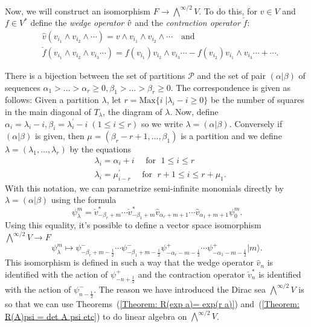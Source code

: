 Now, we will construct an isomorphism $F\rightarrow \bigwedge^{\infty/2}V$. To do this, for $v\in V$ and $f\in V^*$ define the \textit{wedge operator} $\Hat{v}$ and the \textit{contraction operator} $\check{f}$:
\begin{equation}
    \begin{split}
        &\hat{v}(v_{i_1}\wedge v_{i_2}\wedge\cdots) = v\wedge v_{i_1}\wedge v_{i_2}\wedge\cdots\quad\text{and}\\
        &\check{f}(v_{i_1}\wedge v_{i_2}\wedge v_{i_3}\cdots)= f(v_{i_1})v_{i_2}\wedge v_{i_3}\cdots - f(v_{i_2})v_{i_1}\wedge v_{i_3}\cdots+\cdots.
    \end{split}
\end{equation}


There is a bijection between the set of partitions $\mathcal{P}$ and the set of pair $(\alpha |\beta)$ of sequences $\alpha_1>\dots >\alpha_r\geq 0, \beta_1>\dots >\beta_r\geq 0$. The correspondence is given as follows: Given a partition $\lambda$, let $r = \text{Max}\{i\;|\lambda_i-i\geq 0\}$ be the number of squares in the main diagonal of $T_\lambda$, the diagram of $\lambda$. Now, define $\alpha_i = \lambda_i-i, \beta_i=\lambda_i^\prime -i\;(1\leq i\leq r)$ so we write $\lambda = (\alpha |\beta)$. Conversely if $(\alpha|\beta)$ is given, then $\mu=(\beta_r-r+1,\dots,\beta_1)$ is a partition and we define $\lambda=(\lambda_1,\dots,\lambda_r)$ by the equations
\begin{equation}
\begin{split}
    &\lambda_i = \alpha_i +i\quad\text{ for }\; 1\leq i\leq r \\
        &\lambda_i=\mu^\prime_{i-r}\quad \text{ for }\;r+1\leq i\leq r+\mu_1.
\end{split}
\end{equation}
With this notation, we can parametrize semi-infinite monomials directly by $\lambda=(\alpha|\beta)$ using the formula
\begin{equation}
   \psi_\lambda^m= \check{v}^*_{-\beta_r+m}\cdots\check{v}^*_{-\beta_1+m}\hat{v}_{\alpha_r+m+1}\cdots\hat{v}_{\alpha_1+m+1}\psi_0^m.
\end{equation}
Using this equality, it's possible to define a vector space isomorphism $ \bigwedge^{\infty/2}V\rightarrow F$
\begin{equation}
    \psi_\lambda^m\longmapsto \psi^-_{-\beta_r+m-\frac{1}{2}}\cdots\psi^-_{-\beta_1+m-\frac{1}{2}}\psi^+_{-\alpha_r-m-\frac{1}{2}}\cdots\psi^+_{-\alpha_1-m-\frac{1}{2}}|m\rangle.
\end{equation}
 This isomorphism is defined in such a way that the wedge operator $\hat{v}_n$ is identified with the action of $\psi^+_{-n+\frac{1}{2}}$ and the contraction operator $\check{v}_n^*$ is identified with the action of $\psi^-_{n-\frac{1}{2}}$. The reason we have introduced the Dirac sea $\bigwedge^{\infty/2}V$ is so that we can use Theorems~(\ref{Theorem: R(exp a)= exp(r a)}) and~(\ref{Theorem: R(A)psi = det A psi etc}) to do linear algebra on $\bigwedge^{\infty/2}V$.

